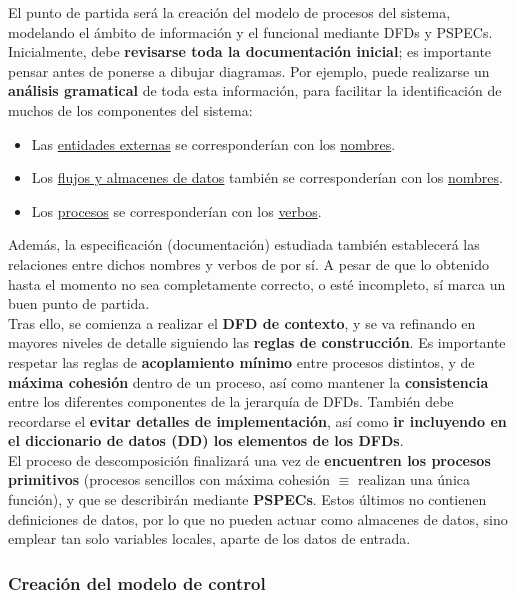 El punto de partida será la creación del modelo de procesos del sistema, modelando el ámbito de información y el funcional mediante DFDs y PSPECs.\\

Inicialmente, debe \textbf{revisarse toda la documentación inicial}; es importante pensar antes de ponerse a dibujar diagramas. Por ejemplo, puede realizarse un \textbf{análisis gramatical} de toda esta información, para facilitar la identificación de muchos de los componentes del sistema:

\begin{itemize}
    \item Las \uline{entidades externas} se corresponderían con los \uline{nombres}.
    \item Los \uline{flujos y almacenes de datos} también se corresponderían con los \uline{nombres}.
    \item Los \uline{procesos} se corresponderían con los \uline{verbos}.
\end{itemize}

Además, la especificación (documentación) estudiada también establecerá las relaciones entre dichos nombres y verbos de por sí. A pesar de que lo obtenido hasta el momento no sea completamente correcto, o esté incompleto, sí marca un buen punto de partida.\\

Tras ello, se comienza a realizar el \textbf{DFD de contexto}, y se va refinando en mayores niveles de detalle siguiendo las \textbf{reglas de construcción}. Es importante respetar las reglas de \textbf{acoplamiento mínimo} entre procesos distintos, y de \textbf{máxima cohesión} dentro de un proceso, así como mantener la \textbf{consistencia} entre los diferentes componentes de la jerarquía de DFDs. También debe recordarse el \textbf{evitar detalles de implementación}, así como \textbf{ir incluyendo en el diccionario de datos (DD) los elementos de los DFDs}.\\

El proceso de descomposición finalizará una vez de \textbf{encuentren los procesos primitivos} (procesos sencillos con máxima cohesión $\equiv$ realizan una única función), y que se describirán mediante \textbf{PSPECs}. Estos últimos no contienen definiciones de datos, por lo que no pueden actuar como almacenes de datos, sino emplear tan solo variables locales, aparte de los datos de entrada.

\subsubsection{Creación del modelo de control}

